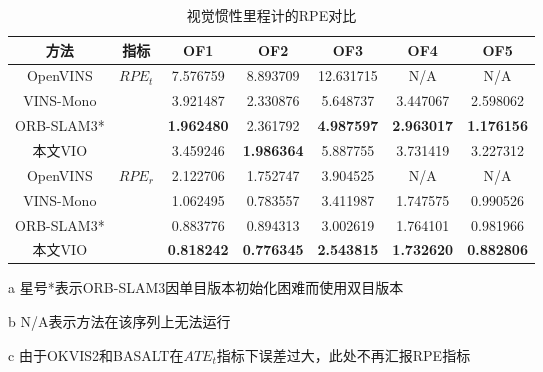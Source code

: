 \begin{table}
\centering
\begin{threeparttable}
\caption{视觉惯性里程计的RPE\textdownarrow{}对比}
\begin{tabular}{ccccccc}
\toprule
方法        & 指标                    & OF1               & OF2               & OF3               & OF4               & OF5               \\ \midrule
OpenVINS  & \multirow{4}{*}{$RPE_t$} & 7.576759          & 8.893709          & 12.631715         & N/A               & N/A               \\
VINS-Mono &                       & 3.921487          & 2.330876          & 5.648737          & 3.447067          & 2.598062          \\
ORB-SLAM3* &                       & \cellcolor[HTML]{FA7F6F}\textbf{1.962480} & 2.361792          & \cellcolor[HTML]{FA7F6F}\textbf{4.987597} & \cellcolor[HTML]{FA7F6F}\textbf{2.963017} & \cellcolor[HTML]{FA7F6F}\textbf{1.176156} \\
本文VIO      &                       & 3.459246          & \cellcolor[HTML]{FA7F6F}\textbf{1.986364} & 5.887755          & 3.731419          & 3.227312          \\ \midrule
OpenVINS  & \multirow{4}{*}{$RPE_r$} & 2.122706          & 1.752747          & 3.904525          & N/A               & N/A               \\
VINS-Mono &                       & 1.062495          & 0.783557          & 3.411987          & 1.747575          & 0.990526          \\
ORB-SLAM3* &                       & 0.883776          & 0.894313          & 3.002619          & 1.764101          & 0.981966          \\
本文VIO       &                       & \cellcolor[HTML]{FA7F6F}\textbf{0.818242} & \cellcolor[HTML]{FA7F6F}\textbf{0.776345} & \cellcolor[HTML]{FA7F6F}\textbf{2.543815} & \cellcolor[HTML]{FA7F6F}\textbf{1.732620} & \cellcolor[HTML]{FA7F6F}\textbf{0.882806} \\ \bottomrule
\end{tabular}
\label{tab:vio_rpe}
\begin{tablenotes}
  \item [a] 星号*表示ORB-SLAM3因单目版本初始化困难而使用双目版本
  \item [b] N/A表示方法在该序列上无法运行
  \item [c] 由于OKVIS2和BASALT在$ATE_t$指标下误差过大，此处不再汇报RPE指标
\end{tablenotes}
\end{threeparttable}
\end{table}

